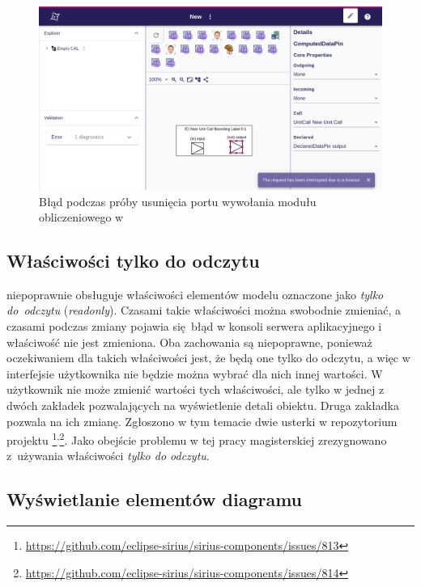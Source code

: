 \begin{figure}[!ht]
  \centering

  \includegraphics[width=0.95\linewidth]{./images/sirius-web-timeout-when-deleting-pins.png}
  \caption{Błąd podczas próby usunięcia portu wywołania modułu obliczeniowego w
    \SiriusWeb{}}\label{rys:sirius-web-timeout-when-deleting-pins}
\end{figure}

\subsection{Właściwości tylko do odczytu}

\SiriusWeb{} niepoprawnie obsługuje właściwości elementów modelu oznaczone
jako
\emph{tylko do~odczytu} (\emph{readonly}). Czasami takie właściwości można
swobodnie zmieniać, a czasami podczas zmiany pojawia się błąd w konsoli serwera
aplikacyjnego i właściwość nie jest zmieniona. Oba zachowania są niepoprawne,
ponieważ oczekiwaniem dla takich właściwości jest, że będą one tylko do
odczytu, a więc w interfejsie użytkownika nie będzie można wybrać dla nich
innej wartości. W \SiriusDesktop{} użytkownik nie może zmienić wartości
tych właściwości, ale tylko w jednej z dwóch zakładek pozwalających na
wyświetlenie detali obiektu. Druga zakładka pozwala na ich zmianę.
Zgłoszono w tym temacie dwie usterki w repozytorium
projektu \SiriusWeb{}\footnote{
	\url{https://github.com/eclipse-sirius/sirius-components/issues/813}
}\textsuperscript{,}\footnote{
	\url{https://github.com/eclipse-sirius/sirius-components/issues/814}
}. Jako obejście problemu w tej pracy magisterskiej zrezygnowano z~używania
właściwości \emph{tylko do odczytu}.

\subsection{Wyświetlanie elementów diagramu}

